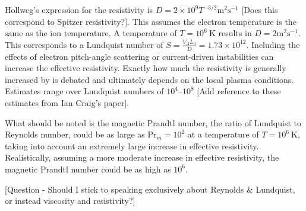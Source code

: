 Hollweg's expression for the resistivity is $D = 2 \times 10^{9} T^{-3/2} \text{m}^2 \text{s}^{-1}$ [Does this correspond to Spitzer resistivity?]. This assumes the electron temperature is the same as the ion temperature. A temperature of $T=10^6\ \text{K}$ results in $D = 2 \text{m}^2 \text{s}^{-1}$. This corresponds to a Lundquist number of $S = \frac{V_A L_0}{D} = 1.73 \times 10^{12}$. Including the effects of electron pitch-angle scattering or current-driven instabilities can increase the effective resistivity. Exactly how much the resistivity is generally increased by is debated and ultimately depends on the local plasma conditions. Estimates range over Lundquist numbers of $10^{4}$--$10^{8}$ [Add reference to these estimates from Ian Craig's paper].

What should be noted is the magnetic Prandtl number, the ratio of Lundquist to Reynolds number, could be as large as $\text{Pr}_m = 10^2$ at a temperature of $T=10^6\ \text{K}$, taking into account an extremely large increase in effective resistivity. Realistically, assuming a more moderate increase in effective resistivity, the magnetic Prandtl number could be as high as $10^{6}$.

[Question - Should I stick to speaking exclusively about Reynolds \& Lundquist, or instead viscosity and resistivity?]
